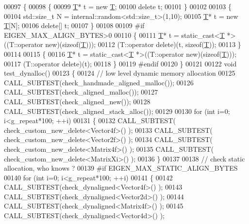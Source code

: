 \begin{DoxyCode}
00097 \{
00098   \{
00099     \hyperlink{group___sparse_core___module}{T}* t = \textcolor{keyword}{new} \hyperlink{group___sparse_core___module}{T};
00100     \textcolor{keyword}{delete} t;
00101   \}
00102   
00103   \{
00104     std::size\_t N = internal::random<std::size\_t>(1,10);
00105     \hyperlink{group___sparse_core___module}{T}* t = \textcolor{keyword}{new} \hyperlink{group___sparse_core___module}{T}[N];
00106     \textcolor{keyword}{delete}[] t;
00107   \}
00108   
00109 \textcolor{preprocessor}{#if EIGEN\_MAX\_ALIGN\_BYTES>0}
00110   \{
00111     \hyperlink{group___sparse_core___module}{T}* t = \textcolor{keyword}{static\_cast<}\hyperlink{group___sparse_core___module}{T} *\textcolor{keyword}{>}((T::operator \textcolor{keyword}{new})(\textcolor{keyword}{sizeof}(\hyperlink{group___sparse_core___module}{T})));
00112     (T::operator \textcolor{keyword}{delete})(t, \textcolor{keyword}{sizeof}(\hyperlink{group___sparse_core___module}{T}));
00113   \}
00114   
00115   \{
00116     \hyperlink{group___sparse_core___module}{T}* t = \textcolor{keyword}{static\_cast<}\hyperlink{group___sparse_core___module}{T} *\textcolor{keyword}{>}((T::operator \textcolor{keyword}{new})(\textcolor{keyword}{sizeof}(\hyperlink{group___sparse_core___module}{T})));
00117     (T::operator \textcolor{keyword}{delete})(t);
00118   \}
00119 \textcolor{preprocessor}{#endif}
00120 \}
00121 
00122 \textcolor{keywordtype}{void} test\_dynalloc()
00123 \{
00124   \textcolor{comment}{// low level dynamic memory allocation}
00125   CALL\_SUBTEST(check\_handmade\_aligned\_malloc());
00126   CALL\_SUBTEST(check\_aligned\_malloc());
00127   CALL\_SUBTEST(check\_aligned\_new());
00128   CALL\_SUBTEST(check\_aligned\_stack\_alloc());
00129 
00130   \textcolor{keywordflow}{for} (\textcolor{keywordtype}{int} i=0; i<g\_repeat*100; ++i)
00131   \{
00132     CALL\_SUBTEST( check\_custom\_new\_delete<Vector4f>() );
00133     CALL\_SUBTEST( check\_custom\_new\_delete<Vector2f>() );
00134     CALL\_SUBTEST( check\_custom\_new\_delete<Matrix4f>() );
00135     CALL\_SUBTEST( check\_custom\_new\_delete<MatrixXi>() );
00136   \}
00137   
00138   \textcolor{comment}{// check static allocation, who knows ?}
00139 \textcolor{preprocessor}{  #if EIGEN\_MAX\_STATIC\_ALIGN\_BYTES}
00140   \textcolor{keywordflow}{for} (\textcolor{keywordtype}{int} i=0; i<g\_repeat*100; ++i)
00141   \{
00142     CALL\_SUBTEST(check\_dynaligned<Vector4f>() );
00143     CALL\_SUBTEST(check\_dynaligned<Vector2d>() );
00144     CALL\_SUBTEST(check\_dynaligned<Matrix4f>() );
00145     CALL\_SUBTEST(check\_dynaligned<Vector4d>() );

\end{DoxyCode}
